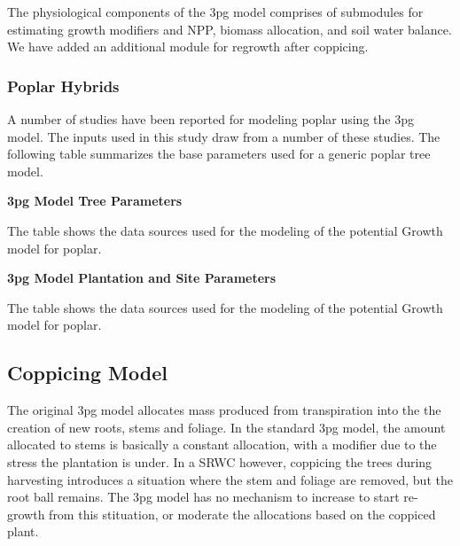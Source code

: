 \documentclass[10pt]{article}
\begin{document}
The physiological components of the \ac{3pg} model comprises of
submodules for estimating growth modifiers and \ac{NPP}, biomass
allocation, and soil water balance.  We have added an additional
module for regrowth after coppicing.

\subsubsection*{Poplar Hybrids}

A number of studies have been reported for modeling poplar using the
\ac{3pg} model.  The inputs used in this study draw from a number of
these studies.  The following table summarizes the base parameters
used for a generic poplar tree model.

\begin{table}[!ht]
\caption{\textbf{\ac{3pg} Model Tree Parameters}}
%

\begin{flushleft}The table shows the data sources used for the
  modeling of the potential Growth model for poplar.
\end{flushleft}
\label{tab:3pg-tree}
 \end{table}


\begin{table}[!ht]
\caption{
\textbf{\ac{3pg} Model Plantation and Site Parameters}}

\begin{flushleft}The table shows the data sources used for the
  modeling of the potential Growth model for poplar.
\end{flushleft}
\label{tab:3pg-plantation-site}
 \end{table}


\subsection*{Coppicing Model}
\label{sec:coppicing-model}
The original \ac{3pg} model allocates mass produced from transpiration
into the the creation of new roots, stems and foliage.  In the
standard \ac{3pg} model, the amount allocated to stems is basically a
constant allocation, with a modifier due to the stress the plantation
is under.  In a \ac{SRWC} however, coppicing the trees during
harvesting introduces a situation where the stem and foliage are
removed, but the root ball remains.  The \ac{3pg} model has no
mechanism to increase to start re-growth from this stituation, or
moderate the allocations based on the coppiced plant.
\end{document}
